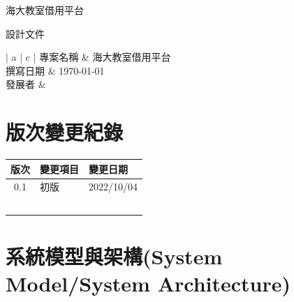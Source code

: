 \documentclass{article}
\begin{document}
\begin{titlepage}
	\centering

	{\huge 海大教室借用平台}

	\vfill

	{\huge 設計文件}

	\vfill

	\begin{Large}
		\begin{center}
			\begin{tabular}{| a | c |}
				\hline
				專案名稱 & 海大教室借用平台               \\ \hline
				撰寫日期 & \today                 \\ \hline
				發展者  &  \\ \hline
			\end{tabular}
		\end{center}
	\end{Large}
\end{titlepage}


\section*{版次變更紀錄}

\begin{tabularx}{\textwidth}{| c | X | X |}
	\rowcolor{LightGray}
	\hline
	版次  & 變更項目 & 變更日期       \\ \hline
	0.1 & 初版   & 2022/10/04 \\ \hline
	    &      &            \\ \hline
	    &      &            \\ \hline
	    &      &            \\ \hline
	    &      &            \\ \hline
	    &      &            \\ \hline
\end{tabularx}

\newpage

\begin{center}
	\tableofcontents
\end{center}

\newpage

\section[系統模型與架構(SYSTEM MODEL/SYSTEM ARCHITECTURE)]{系統模型與架構(System Model/System Architecture)}
\end{document}
